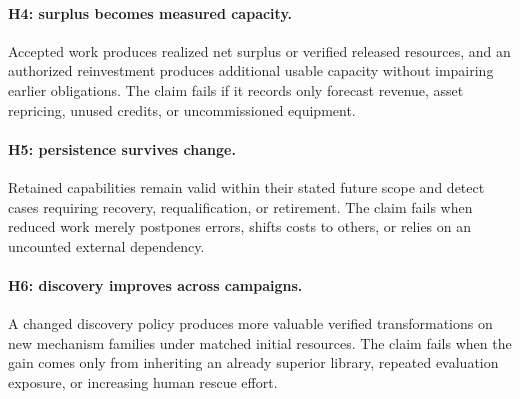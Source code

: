 \documentclass[11pt,letterpaper]{article}
\newcommand{\1}{\mathbf 1}
\theoremstyle{remark}\newtheorem{remark}{Remark}[section]
\begin{document}
\paragraph{H4: surplus becomes measured capacity.}
Accepted work produces realized net surplus or verified released resources, and an authorized reinvestment produces additional usable capacity without impairing earlier obligations. The claim fails if it records only forecast revenue, asset repricing, unused credits, or uncommissioned equipment.

\paragraph{H5: persistence survives change.}
Retained capabilities remain valid within their stated future scope and detect cases requiring recovery, requalification, or retirement. The claim fails when reduced work merely postpones errors, shifts costs to others, or relies on an uncounted external dependency.

\paragraph{H6: discovery improves across campaigns.}
A changed discovery policy produces more valuable verified transformations on new mechanism families under matched initial resources. The claim fails when the gain comes only from inheriting an already superior library, repeated evaluation exposure, or increasing human rescue effort.
\end{document}
